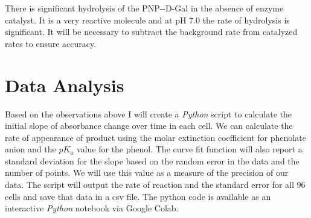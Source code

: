 \documentclass[]{tufte-handout}
\begin{document}
There is significant hydrolysis of the PNP-\textbeta-D-Gal in the absence of enzyme catalyst.  It is a very reactive molecule and at pH 7.0 the rate of hydrolysis is significant. It will be necessary to subtract the background rate from catalyzed rates to ensure accuracy.

\section{Data Analysis}

Based on the observations above I will create a \emph{Python} script to calculate the initial slope of absorbance change over time in each cell. We can calculate the rate of appearance of product using the molar extinction coefficient for phenolate anion and the $pK_a$ value for the phenol. The curve fit function will also report a standard deviation for the slope based on the random error in the data and the number of points. We will use this value as a measure of the precision of our data. The script will output the rate of reaction and the standard error for all 96 cells and save that data in a csv file. The python code is available as an interactive \emph{Python} notebook via Google Colab. 


\nobibliography{}
\end{document}
